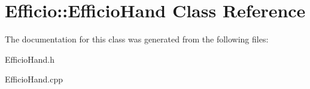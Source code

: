 \hypertarget{class_efficio_1_1_efficio_hand}{}\section{Efficio\+:\+:Efficio\+Hand Class Reference}
\label{class_efficio_1_1_efficio_hand}


The documentation for this class was generated from the following files\+:\begin{DoxyCompactItemize}
\item 
Efficio\+Hand.\+h\item 
Efficio\+Hand.\+cpp\end{DoxyCompactItemize}
